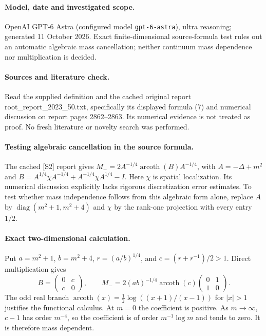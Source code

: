 \documentclass[11pt]{article}
\begin{document}
\paragraph{Model, date and investigated scope.}
OpenAI GPT-6 Astra (configured model \texttt{gpt-6-astra}), ultra reasoning; generated 11 October 2026. Exact finite-dimensional source-formula test rules out an automatic algebraic mass cancellation; neither continuum mass dependence nor multiplication is decided.

\paragraph{Sources and literature check.}
Read the supplied definition and the cached original report root\_report\_2023\_50.txt, specifically its displayed formula (7) and numerical discussion on report pages 2862–2863. Its numerical evidence is not treated as proof. No fresh literature or novelty search was performed.

\paragraph{Testing algebraic cancellation in the source formula.} The cached [S2] report gives \(M_-=2A^{-1/4}\operatorname{arcoth}(B)A^{-1/4}\), with \(A=-\Delta+m^2\) and \(B=A^{1/4}\chi A^{-1/4}+A^{-1/4}\chi A^{1/4}-I\). Here \(\chi\) is spatial localization. Its numerical discussion explicitly lacks rigorous discretization error estimates. To test whether mass independence follows from this algebraic form alone, replace \(A\) by \(\operatorname{diag}(m^2+1,m^2+4)\) and \(\chi\) by the rank-one projection with every entry \(1/2\).
\paragraph{Exact two-dimensional calculation.} Put \(a=m^2+1\), \(b=m^2+4\), \(r=(a/b)^{1/4}\), and \(c=(r+r^{-1})/2>1\). Direct multiplication gives
\[
 B=\begin{pmatrix}0&c\\c&0\end{pmatrix},\qquad
 M_-=2(ab)^{-1/4}\operatorname{arcoth}(c)
 \begin{pmatrix}0&1\\1&0\end{pmatrix}.
\]
The odd real branch \(\operatorname{arcoth}(x)=\frac12\log((x+1)/(x-1))\) for \(|x|>1\) justifies the functional calculus. At \(m=0\) the coefficient is positive. As \(m\to\infty\), \(c-1\) has order \(m^{-4}\), so the coefficient is of order \(m^{-1}\log m\) and tends to zero. It is therefore mass dependent.
\end{document}
